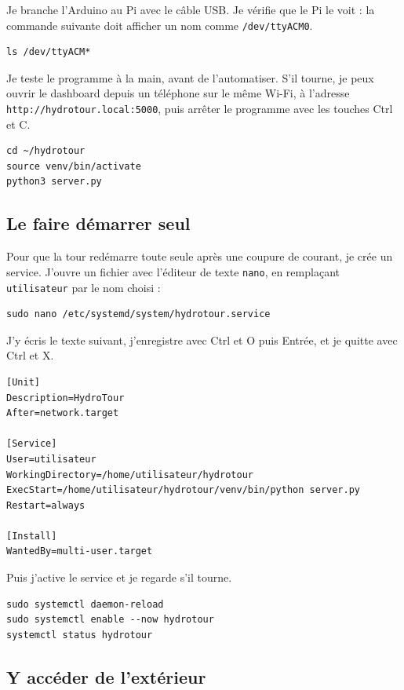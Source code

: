 Je branche l'Arduino au Pi avec le câble USB. Je vérifie que le Pi le voit : la commande suivante doit afficher un nom comme \texttt{/dev/ttyACM0}.

\begin{verbatim}
ls /dev/ttyACM*
\end{verbatim}

Je teste le programme à la main, avant de l'automatiser. S'il tourne, je peux ouvrir le dashboard depuis un téléphone sur le même Wi-Fi, à l'adresse \texttt{http://hydrotour.local:5000}, puis arrêter le programme avec les touches Ctrl et C.

\begin{verbatim}
cd ~/hydrotour
source venv/bin/activate
python3 server.py
\end{verbatim}

\subsection{Le faire démarrer seul}

Pour que la tour redémarre toute seule après une coupure de courant, je crée un service. J'ouvre un fichier avec l'éditeur de texte \texttt{nano}, en remplaçant \texttt{utilisateur} par le nom choisi :

\begin{verbatim}
sudo nano /etc/systemd/system/hydrotour.service
\end{verbatim}

J'y écris le texte suivant, j'enregistre avec Ctrl et O puis Entrée, et je quitte avec Ctrl et X.

\begin{verbatim}
[Unit]
Description=HydroTour
After=network.target

[Service]
User=utilisateur
WorkingDirectory=/home/utilisateur/hydrotour
ExecStart=/home/utilisateur/hydrotour/venv/bin/python server.py
Restart=always

[Install]
WantedBy=multi-user.target
\end{verbatim}

Puis j'active le service et je regarde s'il tourne.

\begin{verbatim}
sudo systemctl daemon-reload
sudo systemctl enable --now hydrotour
systemctl status hydrotour
\end{verbatim}

\subsection{Y accéder de l'extérieur}

